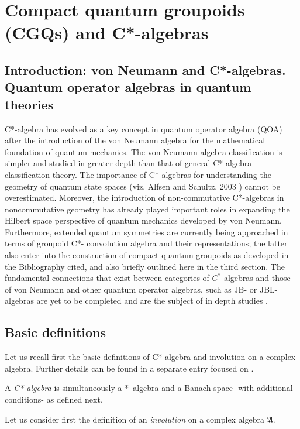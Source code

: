 \documentclass[12pt]{article}
\theoremstyle{plain}
\theoremstyle{definition}
\numberwithin{equation}{section}
\begin{document}
\section{Compact quantum groupoids (CGQs) and C*-algebras}

\subsection{Introduction: von Neumann and C*-algebras. Quantum operator algebras in quantum theories}

 C*-algebra has evolved as a key concept in quantum operator algebra (QOA) after the introduction of the 
von Neumann algebra for the mathematical foundation of quantum mechanics. The von Neumann algebra classification is simpler and studied in greater depth than that of general C*-algebra classification theory. The importance of 
C*-algebras for understanding the geometry of quantum state spaces (viz. Alfsen and Schultz, 2003 \cite{AS2k3}) cannot be overestimated. Moreover, the introduction of non-commutative C*-algebras in noncommutative geometry has already played important roles in expanding the Hilbert space perspective of quantum mechanics developed by von Neumann. Furthermore, extended quantum symmetries are currently being approached in terms of groupoid C*- convolution algebra and their representations; the latter also enter into the construction of compact quantum groupoids as developed in the Bibliography cited, and also briefly outlined here in the third section. The fundamental connections that exist between categories of $C^*$-algebras and those of von Neumann and other quantum operator algebras, such as JB- or JBL- algebras are yet to be completed and are the subject
of in depth studies \cite{AS2k3}.

\subsection{Basic definitions}
 
 Let us recall first the basic definitions of C*-algebra and involution on a complex algebra.
Further details can be found in a separate entry focused on .  

 A \emph{C*-algebra} is simultaneously a *--algebra and a Banach space -with additional conditions- as defined next.

Let us consider first the definition of an \emph{involution} on a complex algebra $\mathfrak A$.
\end{document}

